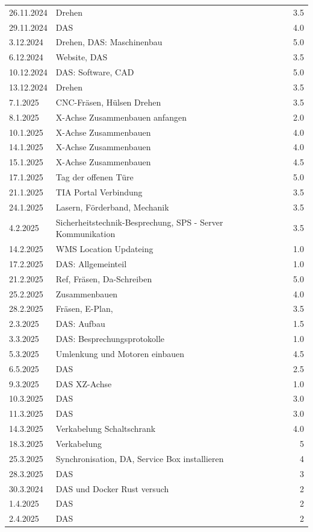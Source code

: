 \begin{longtable}{|l|p{10cm}|r|}
26.11.2024	&Drehen& 3.5\\
29.11.2024	&DAS& 4.0\\
3.12.2024	&Drehen, DAS: Maschinenbau& 5.0\\
6.12.2024	&Website, DAS &3.5\\
10.12.2024	&DAS: Software, CAD	&5.0\\
13.12.2024	&Drehen &3.5\\
7.1.2025	&CNC-Fräsen, Hülsen Drehen&	3.5\\
8.1.2025	&X-Achse Zusammenbauen anfangen	&2.0\\
10.1.2025	&X-Achse Zusammenbauen	&4.0\\
14.1.2025	&X-Achse Zusammenbauen &	4.0\\
15.1.2025	&X-Achse Zusammenbauen &	4.5\\
17.1.2025	&Tag der offenen Türe	&5.0\\
21.1.2025	&TIA Portal Verbindung&	3.5\\
24.1.2025	&Lasern, Förderband, Mechanik	&3.5\\
4.2.2025	&Sicherheitstechnik-Besprechung, SPS - Server Kommunikation	&3.5\\
14.2.2025	&WMS Location Updateing	&1.0\\
17.2.2025	&DAS: Allgemeinteil	&1.0\\
21.2.2025	&Ref, Fräsen, Da-Schreiben	&5.0\\
25.2.2025	&Zusammenbauen&	4.0\\
28.2.2025	&Fräsen, E-Plan,&	3.5\\
2.3.2025	&DAS: Aufbau	&1.5\\
3.3.2025	&DAS: Besprechungsprotokolle&	1.0\\
5.3.2025	&Umlenkung und Motoren einbauen&	4.5\\
6.5.2025	&DAS  &	2.5\\
9.3.2025	&DAS XZ-Achse	&1.0\\
10.3.2025	&DAS	&3.0\\
11.3.2025	&DAS	&3.0\\
14.3.2025	&Verkabelung Schaltschrank	&4.0\\
18.3.2025   &Verkabelung & 5\\
25.3.2025	&Synchronisation, DA, Service Box installieren& 4\\
28.3.2025	&DAS& 3\\
30.3.2024  &DAS und Docker Rust versuch &2\\
1.4.2025& DAS &2\\
2.4.2025& DAS &2\\


\end{longtable}
\newpage

